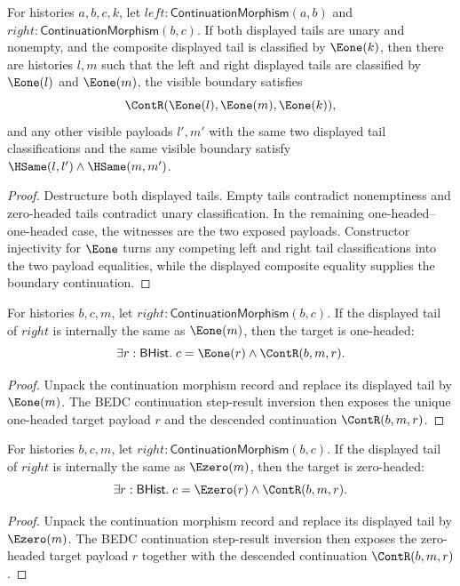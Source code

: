\begin{theorem}
\label{thm:continuation-morphism-comp-nonempty-e1-tail-factors-unique}
For histories $a,b,c,k$, let
$left:\mathsf{ContinuationMorphism}(a,b)$ and
$right:\mathsf{ContinuationMorphism}(b,c)$. If both displayed tails are unary
and nonempty, and the composite displayed tail is classified by $\Eone(k)$,
then there are histories $l,m$ such that the left and right displayed tails are
classified by $\Eone(l)$ and $\Eone(m)$, the visible boundary satisfies
$$
\ContR(\Eone(l),\Eone(m),\Eone(k)),
$$
and any other visible payloads $l',m'$ with the same two displayed tail
classifications and the same visible boundary satisfy
$\HSame(l,l')\land\HSame(m,m')$.
\end{theorem}
\begin{proof}
Destructure both displayed tails. Empty tails contradict nonemptiness and
zero-headed tails contradict unary classification. In the remaining
one-headed--one-headed case, the witnesses are the two exposed payloads.
Constructor injectivity for $\Eone$ turns any competing left and right tail
classifications into the two payload equalities, while the displayed composite
equality supplies the boundary continuation.
\end{proof}

\begin{theorem}
\label{thm:continuation-morphism-right-e1-tail-target-cases}
For histories $b,c,m$, let
$right:\mathsf{ContinuationMorphism}(b,c)$. If the displayed tail of $right$
is internally the same as $\Eone(m)$, then the target is one-headed:
$$
\exists r:\mathsf{BHist}.\;
c=\Eone(r)\land \ContR(b,m,r).
$$
\end{theorem}
\begin{proof}
Unpack the continuation morphism record and replace its displayed tail by
$\Eone(m)$. The BEDC continuation step-result inversion then exposes the
unique one-headed target payload $r$ and the descended continuation
$\ContR(b,m,r)$.
\end{proof}

\begin{theorem}
\label{thm:continuation-morphism-right-e0-tail-target-cases}
For histories $b,c,m$, let
$right:\mathsf{ContinuationMorphism}(b,c)$. If the displayed tail of $right$
is internally the same as $\Ezero(m)$, then the target is zero-headed:
$$
\exists r:\mathsf{BHist}.\;
c=\Ezero(r)\land \ContR(b,m,r).
$$
\end{theorem}
\begin{proof}
Unpack the continuation morphism record and replace its displayed tail by
$\Ezero(m)$. The BEDC continuation step-result inversion then exposes the
zero-headed target payload $r$ together with the descended continuation
$\ContR(b,m,r)$.
\end{proof}

